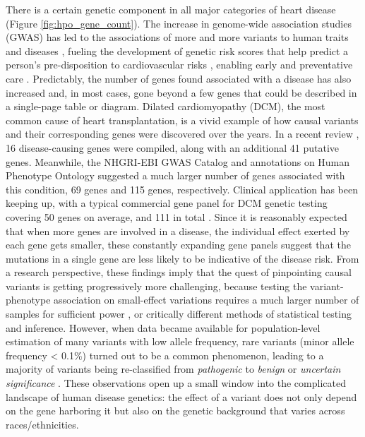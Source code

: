 \documentclass[letter]{bioinfo}
\begin{document}
There is a certain genetic component in all major categories of heart disease (Figure \ref{fig:hpo_gene_count}). The increase in genome-wide association studies (GWAS) has led to the associations of more and more variants to human traits and diseases \citep{Visscher:2017:10}, fueling the development of genetic risk scores that help predict a person's pre-disposition to cardiovascular risks \citep{Ganna:2013:Multilocus,Goldstein:2014:Simple,Krarup:2015:genetic,Tada:2016:Risk, Abraham:2016:Genomic}, enabling early and preventative care \citep{Assimes:2016:Genetic}. Predictably, the number of genes found associated with a disease has also increased and, in most cases, gone beyond a few genes that could be described in a single-page table or diagram.  Dilated cardiomyopathy (DCM), the most common cause of heart transplantation, is a vivid example of how causal variants and their corresponding genes were discovered over the years.  In a recent review \citep{Burke:2016:Clinical}, 16 disease-causing genes were compiled, along with an additional 41 putative genes.  Meanwhile, the NHGRI-EBI GWAS Catalog \citep{MacArthur:2017:new} and annotations on Human Phenotype Ontology \citep{Kohler:2017:Human} suggested a much larger number of genes associated with this condition, 69 genes and 115 genes, respectively.  Clinical application has been keeping up, with a typical commercial gene panel for DCM genetic testing covering 50 genes on average, and 111 in total \citep{McNally:2017:Dilated}.  Since it is reasonably expected that when more genes are involved in a disease, the individual effect exerted by each gene gets smaller, these constantly expanding gene panels suggest that the mutations in a single gene are less likely to be indicative of the disease risk. From a research perspective, these findings imply that the quest of pinpointing causal variants is getting progressively more challenging, because testing the variant-phenotype association on small-effect variations requires a much larger number of samples for sufficient power \citep{Visscher:2017:10}, or critically different methods of statistical testing and inference. However, when data became available for population-level estimation of many variants with low allele frequency, rare variants (minor allele frequency < 0.1\%) turned out to be a common phenomenon, leading to a majority of variants being re-classified from \textit{pathogenic} to \textit{benign} or \textit{uncertain significance} \citep{Lek:2016:Analysis}. These observations open up a small window into the complicated landscape of human disease genetics: the effect of a variant does not only depend on the gene harboring it but also on the genetic background that varies across races/ethnicities.  
\end{document}
